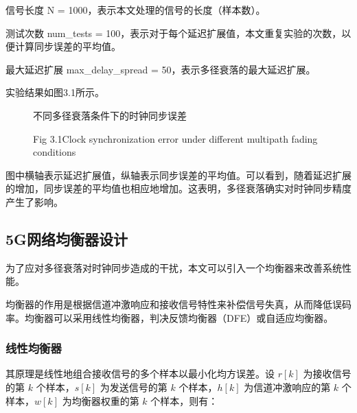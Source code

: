 \documentclass[UTF8,a4paper,12pt]{ctexart}
\numberwithin{equation}{section}
\begin{document}
	信号长度 N = 1000，表示本文处理的信号的长度（样本数）。
	
	测试次数 num\_tests = 100，表示对于每个延迟扩展值，本文重复实验的次数，以便计算同步误差的平均值。
	
	最大延迟扩展 max\_delay\_spread = 50，表示多径衰落的最大延迟扩展。
	
	实验结果如图3.1所示。
	\begin{figure}[htb] 
	    \caption{不同多径衰落条件下的时钟同步误差}
	    \vspace{-10pt}
	    \caption*{Fig 3.1\quad Clock synchronization error under different multipath fading conditions}
	\end{figure}
	
	图中横轴表示延迟扩展值，纵轴表示同步误差的平均值。可以看到，随着延迟扩展的增加，同步误差的平均值也相应地增加。这表明，多径衰落确实对时钟同步精度产生了影响。
	\subsection{5G网络均衡器设计}
	
	为了应对多径衰落对时钟同步造成的干扰，本文可以引入一个均衡器来改善系统性能。
	
	均衡器的作用是根据信道冲激响应和接收信号特性来补偿信号失真，从而降低误码率。均衡器可以采用线性均衡器，判决反馈均衡器（DFE）或自适应均衡器。
	\subsubsection{线性均衡器}
	其原理是线性地组合接收信号的多个样本以最小化均方误差。设 $r[k]$ 为接收信号的第 $k$ 个样本，$s[k]$ 为发送信号的第 $k$ 个样本，$h[k]$ 为信道冲激响应的第 $k$ 个样本，$w[k]$ 为均衡器权重的第 $k$ 个样本，则有：
	
\end{document}
